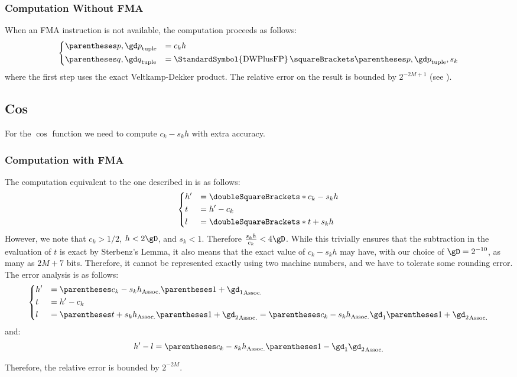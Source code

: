 \documentclass[10pt, a4paper, twoside]{basestyle}
\DeclareMathOperator{\dwplusfp}{\StandardSymbol{DWPlusFP}}
\newcommand{\round}[1]{\doubleSquareBrackets*{#1}}
\begin{document}
\subsubsection*{Computation Without FMA}

When an FMA instruction is not available, the computation proceeds as follows:
\[
\begin{dcases}
\tuple{p, \gd p} &= c_k h \\
\tuple{q, \gd q} &= \dwplusfp\of{\tuple{p, \gd p}, s_k}
\end{dcases}
\]
where the first step uses the exact Veltkamp-Dekker product.  The relative error on the result is bounded by $2^{-2 M + 1}$ (see \cite{MullerRideau2022}).

\subsection*{Cos}

For the $\cos$ function we need to compute $c_k - s_k h$ with extra accuracy.

\subsubsection*{Computation with FMA}

The computation equivalent to the one described in  is as follows:
\[
\begin{dcases}
h' &= \round{c_k - s_k h} \\
t &= h' - c_k \\
l &= \round{t + s_k h}
\end{dcases}
\]
However, we note that $c_k > 1/2$, $h < 2 \gD$, and $s_k < 1$.  Therefore $\frac{s_k h}{c_k} < 4 \gD$.  While this trivially ensures that the subtraction in the evaluation of $t$ is exact by Sterbenz's Lemma, it also means that the exact value of $c_k - s_k h$ may have, with our choice of $\gD = 2^{-10}$, as many as $2 M + 7$ bits.  Therefore, it cannot be represented exactly using two machine numbers, and we have to tolerate some rounding error.  The error analysis is as follows:
\[
\begin{dcases}
h' &= \pa{c_k - s_k h} \pa{1 + \gd_1} \\
t &= h' - c_k \\
l &= \pa{t + s_k h} \pa{1 + \gd_2} = \pa{c_k - s_k h} \gd_1 \pa{1 + \gd_2}
\end{dcases}
\]
and:
\[
h' - l = \pa{c_k - s_k h} \pa{1 - \gd_1 \gd_2}
\]

Therefore, the relative error is bounded by $2^{-2 M}$.
\end{document}
